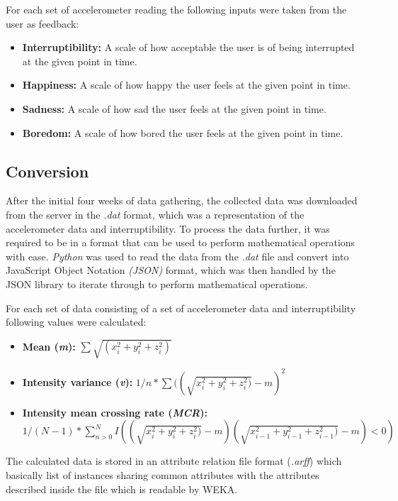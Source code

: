 \documentclass[10pt,a4paper]{article}
\begin{document}
For each set of accelerometer reading the following inputs were taken from the user as feedback:
\begin{itemize}
\item\textbf{Interruptibility:} A scale of how acceptable the user is of being interrupted at the given point in time.
\item\textbf{Happiness:} A scale of how happy the user feels at the given point in time.
\item\textbf{Sadness:} A scale of how sad the user feels at the given point in time.
\item\textbf{Boredom:} A scale of how bored the user feels at the given point in time.
\end{itemize}

\subsection{Conversion}
\label{conversion}
After the initial four weeks of data gathering, the collected data was downloaded from the server in the \textit{.dat} format, which was a representation of the accelerometer data and interruptibility. To process the data further, it was required to be in a format that can be used to perform mathematical operations with ease. \textit{Python} was used to read the data from the \textit{.dat} file and convert into JavaScript Object Notation \textit{(JSON)} format, which was then handled by the JSON library to iterate through to perform mathematical operations.

For each set of data consisting of a set of accelerometer data and interruptibility following values were calculated:
\begin{itemize}
\item\textbf{Mean (\textit{m}):} $\sum{\sqrt{(x_i^2+y_i^2+z_i^2)}}$
\item\textbf{Intensity variance (\textit{v}):} $1/n *\sum{{((\sqrt{x_i^2+y_i^2+z_i^2)}-m)^2}}$
\item\textbf{Intensity mean crossing rate (\textit{MCR}):} $1/(N-1) * \sum\nolimits_{n> 0}^N{I((\sqrt{x_i^2+y_i^2+z_i^2)}-m)(\sqrt{x_{i-1}^2+y_{i-1}^2+z_{i-1}^2)}-m)<0)}$
\end{itemize}

The calculated data is stored in an attribute relation file format (\textit{.arff}) which basically list of instances sharing common attributes with the attributes described inside the file which is readable by WEKA.
\end{document}

